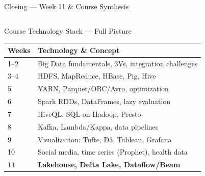 \documentclass[aspectratio=169,10pt]{beamer}
\begin{document}
\begin{frame}{Closing — Week 11 \& Course Synthesis}
  \begin{columns}[T]
      \begin{block}{Course Technology Stack — Full Picture}
        \renewcommand{\arraystretch}{1.2}
        \begin{tabular}{@{}p{1.5cm}p{5.3cm}@{}}
          \toprule
          \textbf{Weeks} & \textbf{Technology \& Concept} \\
          \midrule
          1--2  & Big Data fundamentals, 3Vs, integration challenges \\
          3--4  & HDFS, MapReduce, HBase, Pig, Hive \\
          5     & YARN, Parquet/ORC/Avro, optimization \\
          6     & Spark RDDs, DataFrames, lazy evaluation \\
          7     & HiveQL, SQL-on-Hadoop, Presto \\
          8     & Kafka, Lambda/Kappa, data pipelines \\
          9     & Visualization: Tufte, D3, Tableau, Grafana \\
          10    & Social media, time series (Prophet), health data \\
          \textbf{11}   & \textbf{Lakehouse, Delta Lake, Dataflow/Beam} \\
          \bottomrule
        \end{tabular}
      \end{block}


\end{columns}
\end{frame}
\end{document}
